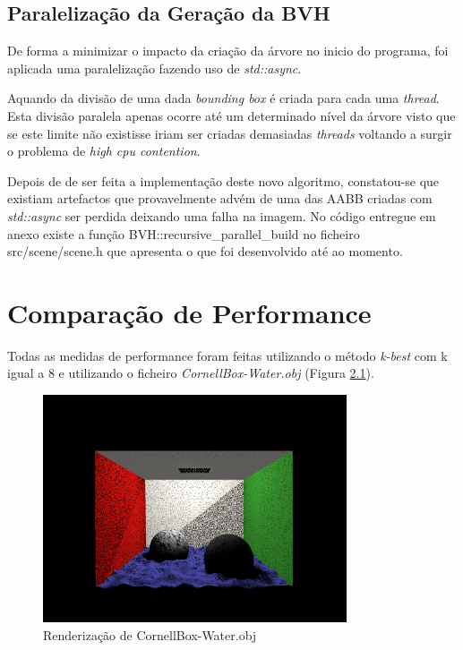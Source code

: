 \documentclass[a4paper]{report}
\begin{document}
\section{Paralelização da Geração da BVH}

De forma a minimizar o impacto da criação da árvore no inicio do programa, foi
aplicada uma paralelização fazendo uso de \textit{std::async}.

Aquando da divisão de uma dada \textit{bounding box} é criada para cada uma
\textit{thread}. Esta divisão paralela apenas ocorre até um determinado nível da
árvore visto que se este limite não existisse iriam ser criadas demasiadas
\textit{threads} voltando a surgir o problema de \textit{high cpu contention}.

Depois de de ser feita a implementação deste novo algoritmo, constatou-se que
existiam artefactos que provavelmente advém de uma das AABB criadas com
\textit{std::async} ser perdida deixando uma falha na imagem. No código entregue
em anexo existe a função BVH::recursive\_parallel\_build no ficheiro
src/scene/scene.h que apresenta o que foi desenvolvido até ao momento.

\chapter{Comparação de Performance}

Todas as medidas de performance foram feitas utilizando o método \textit{k-best}
com k igual a 8 e utilizando o ficheiro \textit{CornellBox-Water.obj} (Figura
\ref{fig:water}).

\begin{figure}[h]
    \centering
        \includegraphics[width=0.8\textwidth]{images/water.png}
        \caption{Renderização de CornellBox-Water.obj}
        \label{fig:water}
\end{figure}
\end{document}
